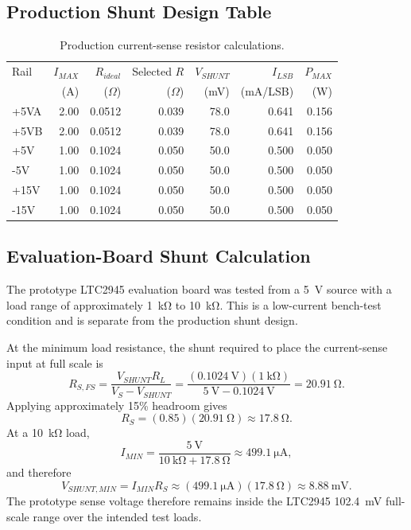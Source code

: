 \subsection{Production Shunt Design Table}
\begin{table}[H]
    \centering
    \caption{Production current-sense resistor calculations.}
    \label{tab:production-shunts}
    \begin{tabular}{lrrrrrr}
        \toprule
        Rail & $I_{MAX}$ & $R_{ideal}$ & Selected $R$ &
        $V_{SHUNT}$ & $I_{LSB}$ & $P_{MAX}$ \\
        & (A) & ($\Omega$) & ($\Omega$) &
        (mV) & (mA/LSB) & (W) \\
        \midrule
        +5VA  & 2.00 & 0.0512 & 0.039 & 78.0 & 0.641 & 0.156 \\
        +5VB  & 2.00 & 0.0512 & 0.039 & 78.0 & 0.641 & 0.156 \\
        +5V   & 1.00 & 0.1024 & 0.050 & 50.0 & 0.500 & 0.050 \\
        -5V   & 1.00 & 0.1024 & 0.050 & 50.0 & 0.500 & 0.050 \\
        +15V  & 1.00 & 0.1024 & 0.050 & 50.0 & 0.500 & 0.050 \\
        -15V  & 1.00 & 0.1024 & 0.050 & 50.0 & 0.500 & 0.050 \\
        \bottomrule
    \end{tabular}
\end{table}

\subsection{Evaluation-Board Shunt Calculation}
The prototype LTC2945 evaluation board was tested from a \SI{5}{\volt} source
with a load range of approximately \SI{1}{\kilo\ohm} to \SI{10}{\kilo\ohm}.
This is a low-current bench-test condition and is separate from the production
shunt design.

At the minimum load resistance, the shunt required to place the current-sense
input at full scale is
\begin{equation}
    R_{S,FS}=\frac{V_{SHUNT}R_L}{V_S-V_{SHUNT}}
    =\frac{(\SI{0.1024}{\volt})(\SI{1}{\kilo\ohm})}
    {\SI{5}{\volt}-\SI{0.1024}{\volt}}
    =\SI{20.91}{\ohm}.
\end{equation}
Applying approximately 15\% headroom gives
\begin{equation}
    R_S=(0.85)(\SI{20.91}{\ohm})\approx\SI{17.8}{\ohm}.
\end{equation}
At a \SI{10}{\kilo\ohm} load,
\begin{equation}
    I_{MIN}=\frac{\SI{5}{\volt}}
    {\SI{10}{\kilo\ohm}+\SI{17.8}{\ohm}}
    \approx\SI{499.1}{\micro\ampere},
\end{equation}
and therefore
\begin{equation}
    V_{SHUNT,MIN}=I_{MIN}R_S
    \approx(\SI{499.1}{\micro\ampere})(\SI{17.8}{\ohm})
    \approx\SI{8.88}{\milli\volt}.
\end{equation}
The prototype sense voltage therefore remains inside the LTC2945
\SI{102.4}{\milli\volt} full-scale range over the intended test loads.

